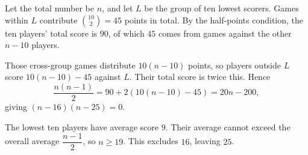Let the total number be $n$, and let $L$ be the group of ten lowest scorers. Games within $L$ contribute $\binom{10}{2}=45$ points in total. By the half-points condition, the ten players' total score is $90$, of which $45$ comes from games against the other $n-10$ players.

Those cross-group games distribute $10(n-10)$ points, so players outside $L$ score $10(n-10)-45$ against $L$. Their total score is twice this. Hence
\[
\dfrac{n(n-1)}{2}=90+2(10(n-10)-45)=20n-200,
\]
giving $(n-16)(n-25)=0$.

The lowest ten players have average score $9$. Their average cannot exceed the overall average $\dfrac{n-1}{2}$, so $n\ge19$. This excludes $16$, leaving $\boxed{25}$.
